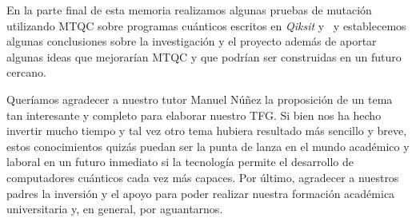 En la parte final de esta memoria realizamos algunas pruebas de mutación utilizando MTQC sobre programas cuánticos escritos en \textit{Qiksit} y \qsh\ y establecemos algunas conclusiones sobre la investigación y el proyecto además de aportar algunas ideas que mejorarían MTQC y que podrían ser construidas en un futuro cercano.

Queríamos agradecer a nuestro tutor Manuel Núñez la proposición de un tema tan interesante y completo para elaborar nuestro TFG. Si bien nos ha hecho invertir mucho tiempo y tal vez otro tema hubiera resultado más sencillo y breve, estos conocimientos quizás puedan ser la punta de lanza en el mundo académico y laboral en un futuro inmediato si la tecnología permite el desarrollo de computadores cuánticos cada vez más capaces. Por último, agradecer a nuestros padres la inversión y el apoyo para poder realizar nuestra formación académica universitaria y, en general, por aguantarnos.
